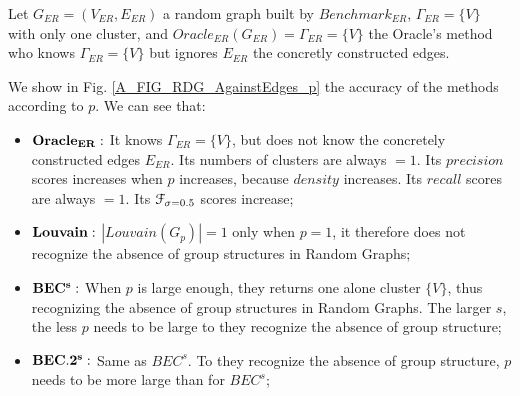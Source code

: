 \documentclass[12pt]{article}
\theoremstyle{thmstyleone}%
\theoremstyle{definition}
\begin{document}
\vspace{0.20cm}
\noindent
Let $G_{ER}=(V_{ER},E_{ER})$ a random graph built by $Benchmark_{ER}$, $\Gamma_{ER}=\{V\}$ with only one cluster,
and $Oracle_{ER}(G_{ER})=\Gamma_{ER}=\{V\}$ the Oracle's method who knows $\Gamma_{ER}=\{V\}$ but ignores $E_{ER}$ the concretly constructed edges.

\noindent
We show in Fig. \ref{A_FIG_RDG_AgainstEdges_p} the accuracy of the methods according to $p$.
We can see that:
\begin{itemize}
  \item $\bf Oracle_{ER}:$ It knows $\Gamma_{ER}=\{V\}$, but does not know the concretely constructed edges $E_{ER}$.
    Its numbers of clusters are always $=1$.
    Its $precision$ scores increases when $p$ increases, because $density$ increases.
    Its $recall$ scores are always $=1$.
    Its $\EuScript{F}_{\sigma=0.5}$ scores increase;

  \item $\bf Louvain:$ $|Louvain(G_p)|=1$ only when $p=1$, it therefore does not recognize the absence of group structures in Random Graphs;

 \item $\bf BEC^{s}:$ When $p$ is large enough, they returns one alone cluster $\{V\}$, thus recognizing the absence of group structures in Random Graphs. The larger $s$, the less $p$ needs to be large to they recognize the absence of group structure;

 \item $\bf BEC.2^{s}:$ Same as $BEC^{s}$. To they recognize the absence of group structure, $p$ needs to be more large than for $BEC^{s}$;
\end{itemize}
\end{document}
